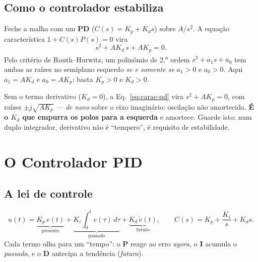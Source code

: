 \section{Como o controlador estabiliza}
Feche a malha com um \textbf{PD} ($C(s)=K_p+K_d s$) sobre $A/s^2$. A
equa\c{c}\~ao caracter\'istica $1+C(s)P(s)=0$ vira
\begin{equation}
s^2 + A K_d\, s + A K_p = 0.
\label{eq:carac-pd}
\end{equation}
Pelo crit\'erio de Routh--Hurwitz, um polin\^omio de 2.\textsuperscript{a} ordem
$s^2+a_1 s+a_0$ tem ambas as ra\'izes no semiplano esquerdo \emph{se e somente se}
$a_1>0$ e $a_0>0$. Aqui $a_1=AK_d$ e $a_0=AK_p$: basta $K_p>0$ e $K_d>0$.
\begin{atencao}
Sem o termo derivativo ($K_d=0$), a Eq.~\eqref{eq:carac-pd} vira $s^2+AK_p=0$, com
ra\'izes $\pm j\sqrt{AK_p}$ --- \emph{de novo} sobre o eixo imagin\'ario:
oscila\c{c}\~ao n\~ao amortecida. \textbf{\'E o $K_d$ que empurra os polos para a
esquerda} e amortece. Guarde isto: num duplo integrador, derivativo n\~ao \'e
``tempero'', \'e requisito de estabilidade.
\end{atencao}

\chapter{O Controlador PID}\label{cap:pid}

\section{A lei de controle}
\begin{equation}
u(t) = \underbrace{K_p\,e(t)}_{\text{presente}}
     + \underbrace{K_i\!\int_0^t\! e(\tau)\,d\tau}_{\text{passado}}
     + \underbrace{K_d\,\dot e(t)}_{\text{futuro}},
\qquad C(s)=K_p+\frac{K_i}{s}+K_d s.
\end{equation}
Cada termo olha para um ``tempo'': o \textbf{P} reage ao erro \emph{agora}, o
\textbf{I} acumula o \emph{passado}, e o \textbf{D} antecipa a tend\^encia
(\emph{futuro}).

